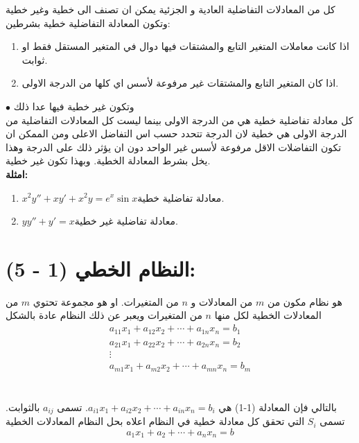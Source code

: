 كل من المعادلات التفاضلية العادية و الجزئية يمكن ان تصنف الى خطية وغير خطية وتكون المعادلة التفاضلية خطية بشرطين:
\begin{enumerate}[label=\textcolor{red}{$\bullet$}]
	\item اذا كانت معاملات المتغير التابع والمشتقات فيها دوال في المتغير المستقل فقط او ثوابت.
	
	\item اذا كان المتغير التابع والمشتقات غير مرفوعة لأسس اي كلها من الدرجة الاولى.
\end{enumerate}  
\noindent
$\bullet$ وتكون غير خطية فيها عدا ذلك
\\[10pt]
كل معادلة تفاضلية خطية هي من الدرجة الاولى بينما ليست كل المعادلات التفاضلية من الدرجة الاولى هي خطية لان الدرجة تتحدد حسب اس التفاضل الاعلى ومن الممكن ان تكون التفاضلات الاقل مرفوعة لأسس غير الواحد دون ان يؤثر ذلك على الدرجة وهذا يخل بشرط المعادلة الخطية. وبهذا تكون غير خطية.
\\[10pt]
\noindent
\textbf{امثلة:}
\begin{enumerate}
	\item $x^2 y'' + xy' + x^2 y = e^x \sin x$\qquad معادلة تفاضلية خطية.
	\item $yy'' + y' = x$\qquad\qquad\qquad\quad معادلة تفاضلية غير خطية.
\end{enumerate}
\section*{النظام الخطي (1 - 5):}
هو نظام مكون من $m$ من المعادلات و $n$ من المتغيرات. او هو مجموعة تحتوي $m$ من المعادلات الخطية لكل منها $n$ من المتغيرات ويعبر عن ذلك النظام عادة بالشكل
\renewcommand{\theequation}{\arabic{chapter}-\arabic{equation}}
\begin{equation}
	\begin{gathered}
	a_{11}x_1 + a_{12}x_2 + \cdots + a_{1n} x_n = b_1\\
	a_{21}x_1 + a_{22}x_2 + \cdots + a_{2n} x_n = b_2\\
\vdots\\
	a_{m1}x_1 + a_{m2}x_2 + \cdots + a_{mn} x_n = b_m
\end{gathered}
\end{equation}
\\ \\
بالتالي فإن المعادلة (1-1) هي $a_{i1}x_1+a_{i2}x_2 +\cdots+a_{in}x_n=b_i$. تسمى $a_{ij}$ بالثوابت. تسمى $S_i$ التي تحقق كل معادلة خطية في النظام اعلاه بحل النظام المعادلات الخطية
\[
a_1x_1 + a_2 + \cdots + a_n x_n = b
\]


